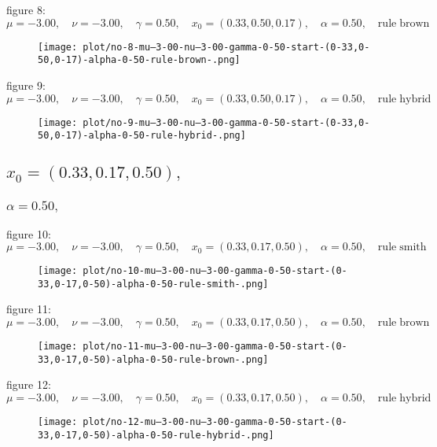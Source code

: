 \documentclass[a4paper]{article}
\begin{document}
\begin{multicols*}{2}
figure 8: \(\mu = -3.00,\quad \nu = -3.00,\quad \gamma = 0.50,\quad x_0 = (0.33,0.50,0.17),\quad \alpha = 0.50,\quad \mathrm{rule} \; \mathrm{brown}\)
   \begin{figure}[H]
   \centering
   \texttt{[image: plot/no-8-mu--3-00-nu--3-00-gamma-0-50-start-(0-33,0-50,0-17)-alpha-0-50-rule-brown-.png]}
   \end{figure}
   
figure 9: \(\mu = -3.00,\quad \nu = -3.00,\quad \gamma = 0.50,\quad x_0 = (0.33,0.50,0.17),\quad \alpha = 0.50,\quad \mathrm{rule} \; \mathrm{hybrid}\)
   \begin{figure}[H]
   \centering
   \texttt{[image: plot/no-9-mu--3-00-nu--3-00-gamma-0-50-start-(0-33,0-50,0-17)-alpha-0-50-rule-hybrid-.png]}
   \end{figure}
   

   \subsection{\(x_0 = (0.33,0.17,0.50),\quad \)}
   

   \subsubsection{\(\alpha = 0.50,\quad \)}
   
figure 10: \(\mu = -3.00,\quad \nu = -3.00,\quad \gamma = 0.50,\quad x_0 = (0.33,0.17,0.50),\quad \alpha = 0.50,\quad \mathrm{rule} \; \mathrm{smith}\)
   \begin{figure}[H]
   \centering
   \texttt{[image: plot/no-10-mu--3-00-nu--3-00-gamma-0-50-start-(0-33,0-17,0-50)-alpha-0-50-rule-smith-.png]}
   \end{figure}
   
figure 11: \(\mu = -3.00,\quad \nu = -3.00,\quad \gamma = 0.50,\quad x_0 = (0.33,0.17,0.50),\quad \alpha = 0.50,\quad \mathrm{rule} \; \mathrm{brown}\)
   \begin{figure}[H]
   \centering
   \texttt{[image: plot/no-11-mu--3-00-nu--3-00-gamma-0-50-start-(0-33,0-17,0-50)-alpha-0-50-rule-brown-.png]}
   \end{figure}
   
figure 12: \(\mu = -3.00,\quad \nu = -3.00,\quad \gamma = 0.50,\quad x_0 = (0.33,0.17,0.50),\quad \alpha = 0.50,\quad \mathrm{rule} \; \mathrm{hybrid}\)
   \begin{figure}[H]
   \centering
   \texttt{[image: plot/no-12-mu--3-00-nu--3-00-gamma-0-50-start-(0-33,0-17,0-50)-alpha-0-50-rule-hybrid-.png]}
   \end{figure}
   


\end{multicols*}
\end{document}

